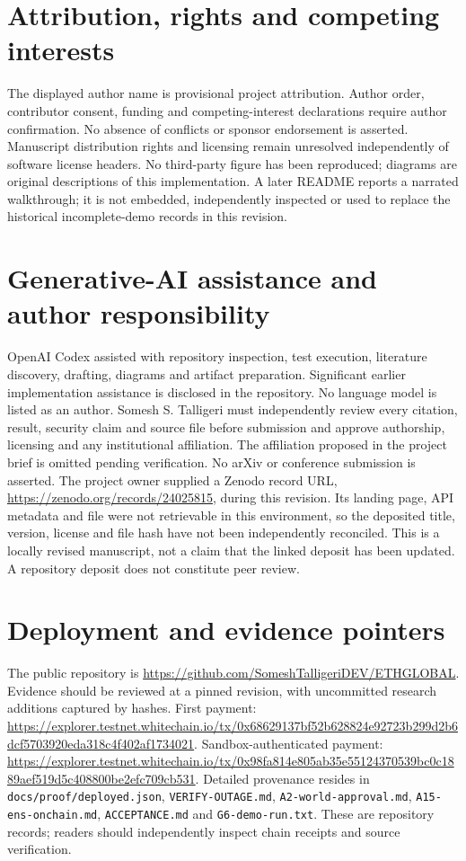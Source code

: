 \documentclass[11pt]{article}
\newcommand{\code}[1]{\nolinkurl{#1}}
\begin{document}
\section*{Attribution, rights and competing interests}
The displayed author name is provisional project attribution. Author order, contributor consent, funding and competing-interest declarations require author confirmation. No absence of conflicts or sponsor endorsement is asserted. Manuscript distribution rights and licensing remain unresolved independently of software license headers. No third-party figure has been reproduced; diagrams are original descriptions of this implementation. A later README reports a narrated walkthrough; it is not embedded, independently inspected or used to replace the historical incomplete-demo records in this revision.

\section*{Generative-AI assistance and author responsibility}
OpenAI Codex assisted with repository inspection, test execution, literature discovery, drafting, diagrams and artifact preparation. Significant earlier implementation assistance is disclosed in the repository. No language model is listed as an author. Somesh S. Talligeri must independently review every citation, result, security claim and source file before submission and approve authorship, licensing and any institutional affiliation. The affiliation proposed in the project brief is omitted pending verification. No arXiv or conference submission is asserted. The project owner supplied a Zenodo record URL, \url{https://zenodo.org/records/24025815}, during this revision. Its landing page, API metadata and file were not retrievable in this environment, so the deposited title, version, license and file hash have not been independently reconciled. This is a locally revised manuscript, not a claim that the linked deposit has been updated. A repository deposit does not constitute peer review.



\appendix
\section{Deployment and evidence pointers}\label{app:evidence}
The public repository is \url{https://github.com/SomeshTalligeriDEV/ETHGLOBAL}. Evidence should be reviewed at a pinned revision, with uncommitted research additions captured by hashes. First payment:
\url{https://explorer.testnet.whitechain.io/tx/0x68629137bf52b628824e92723b299d2b6dcf5703920eda318c4f402af1734021}.
Sandbox-authenticated payment:
\url{https://explorer.testnet.whitechain.io/tx/0x98fa814e805ab35e55124370539bc0c1889aef519d5c408800be2efc709cb531}.
Detailed provenance resides in \code{docs/proof/deployed.json}, \code{VERIFY-OUTAGE.md}, \code{A2-world-approval.md}, \code{A15-ens-onchain.md}, \code{ACCEPTANCE.md} and \code{G6-demo-run.txt}. These are repository records; readers should independently inspect chain receipts and source verification.
\end{document}
